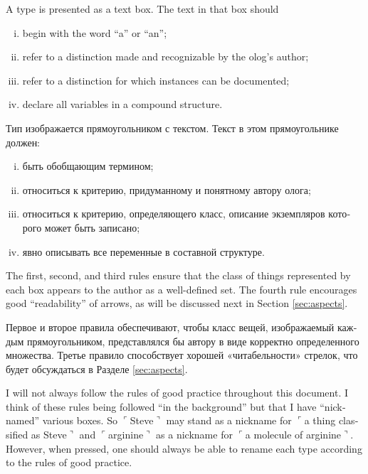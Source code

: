 \documentclass{book}
\def\tn{\textnormal}
\newcommand{\fakebox}[1]{\tn{$\ulcorner$#1$\urcorner$}}
\theoremstyle{theoremENG}
\theoremstyle{lemmaENG}
\theoremstyle{propositionENG}
\theoremstyle{corollaryENG}
\theoremstyle{factENG}
\theoremstyle{remarkENG}
\theoremstyle{exampleENG}
\theoremstyle{warningENG}
\theoremstyle{questionENG}
\theoremstyle{guessENG}
\theoremstyle{answerENG}
\theoremstyle{constructionENG}
\theoremstyle{rulesENG}
\newtheorem{rulesENG}[subsubsection]{\begin{english}Rules of good practice\end{english}}
\theoremstyle{excENG}
\theoremstyle{appENG}
\theoremstyle{definitionENG}
\theoremstyle{notationENG}
\theoremstyle{conjectureENG}
\theoremstyle{postulateENG}
\theoremstyle{theoremRUS}
\theoremstyle{lemmaRUS}
\theoremstyle{propositionRUS}
\theoremstyle{corollaryRUS}
\theoremstyle{factRUS}
\theoremstyle{remarkRUS}
\theoremstyle{exampleRUS}
\theoremstyle{warningRUS}
\theoremstyle{questionRUS}
\theoremstyle{guessRUS}
\theoremstyle{answerRUS}
\theoremstyle{constructionRUS}
\theoremstyle{rulesRUS}
\newtheorem{rulesRUS}[subsubsection]{\begin{russian}Рекомендации\end{russian}}
\theoremstyle{excRUS}
\theoremstyle{appRUS}
\theoremstyle{definitionRUS}
\theoremstyle{notationRUS}
\theoremstyle{conjectureRUS}
\theoremstyle{postulateRUS}
\begin{document}
\begin{english}
\begin{rulesENG}\label{rules:types}
A type is presented as a text box.  The text in that box should 
\begin{enumerate}[(i)]
\item begin with the word “a” or “an”;
\item refer to a distinction made and recognizable by the olog's author;
\item refer to a distinction for which instances can be documented;
\item declare all variables in a compound structure. 
\end{enumerate}
\end{rulesENG}

\begin{rulesRUS}\label{rules:types}
\begin{russian} 
Тип изображается прямоугольником с текстом. Текст в этом прямоугольнике должен:
\begin{enumerate}[(i)]
\item быть обобщающим термином;
\item относиться к критерию, придуманному и понятному автору олога;
\item относиться к критерию, определяющего класс, описание экземпляров которого может быть записано;
\item явно описывать все переменные в составной структуре. 
\end{enumerate}
\end{russian}
\end{rulesRUS}

The first, second, and third rules ensure that the class of things represented by each box appears to the author as a well-defined set.  The fourth rule encourages good “readability” of arrows, as will be discussed next in Section \ref{sec:aspects}.  

\begin{russian}Первое и второе правила обеспечивают, чтобы класс вещей, изображаемый каждым прямоугольником, представлялся бы автору в виде корректно определенного множества.  Третье правило способствует хорошей «читабельности» стрелок, что будет обсуждаться в Разделе \ref{sec:aspects}.\end{russian}

I will not always follow the rules of good practice throughout this document.  I think of these rules being followed “in the background” but that I have “nicknamed” various boxes.  So \fakebox{Steve} may stand as a nickname for \fakebox{a thing classified as Steve} and \fakebox{arginine} as a nickname for \fakebox{a molecule of arginine}. However, when pressed, one should always be able to rename each type according to the rules of good practice.


\end{english}
\end{document}
